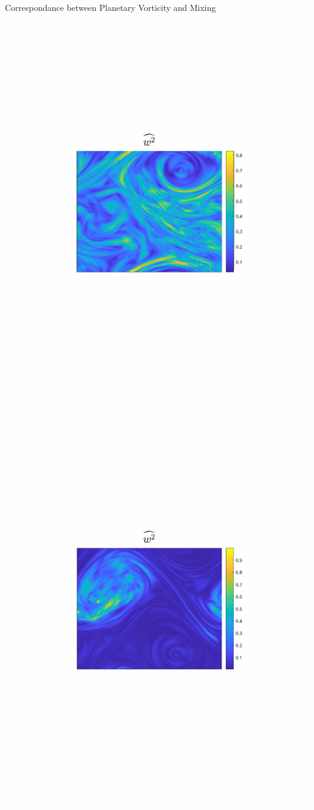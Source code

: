 \documentclass[aspecttatio=169]{beamer}
\begin{document}
\begin{frame}{Correspondance between Planetary Vorticity and Mixing}
        \includegraphics[width=1\textwidth]{images/Om3B30_uzrms_bar.pdf}
    \emp
        \centering
        \includegraphics[width=1\textwidth]{images/Om10B30_uzrms_bar.pdf}

\end{frame}
\end{document}
